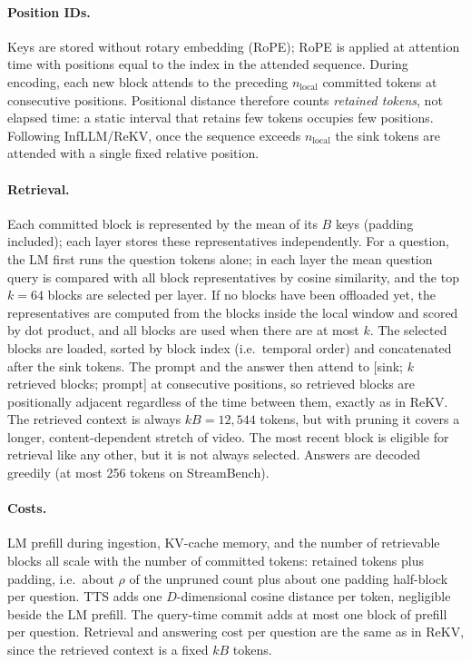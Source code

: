 \paragraph{Position IDs.}
Keys are stored without rotary embedding (RoPE); RoPE is applied at attention time with
positions equal to the index in the attended sequence. During encoding, each new block
attends to the preceding $n_{\text{local}}$ committed tokens at consecutive positions.
Positional distance therefore counts \emph{retained tokens}, not elapsed time: a static
interval that retains few tokens occupies few positions. Following InfLLM/ReKV, once the
sequence exceeds $n_{\text{local}}$ the sink tokens are attended with a single fixed
relative position.

\paragraph{Retrieval.}
Each committed block is represented by the mean of its $B$ keys (padding included);
each layer stores these representatives independently. For a question, the LM first
runs the question tokens alone; in each layer the mean question query is compared with
all block representatives by cosine similarity, and the top $k{=}64$ blocks are
selected per layer. If no blocks have been offloaded yet, the representatives are
computed from the blocks inside the local window and scored by dot product, and all
blocks are used when there are at most $k$. The selected blocks are loaded, sorted by block index (i.e.\ temporal
order) and concatenated after the sink tokens. The prompt and the answer then attend
to [sink; $k$ retrieved blocks; prompt] at consecutive positions, so retrieved blocks
are positionally adjacent regardless of the time between them, exactly as in ReKV. The
retrieved context is always $kB{=}12{,}544$ tokens, but with pruning it covers a
longer, content-dependent stretch of video. The most recent block is eligible for
retrieval like any other, but it is not always selected. Answers are decoded greedily
(at most 256 tokens on StreamBench).

\paragraph{Costs.}
LM prefill during ingestion, KV-cache memory, and the number of retrievable blocks all
scale with the number of committed tokens: retained tokens plus padding, i.e.\ about
$\rho$ of the unpruned count plus about one padding half-block per question. TTS adds
one $D$-dimensional cosine distance per token, negligible beside the LM prefill. The
query-time commit adds at most one block of prefill per question. Retrieval and
answering cost per question are the same as in ReKV, since the retrieved context is a
fixed $kB$ tokens.

